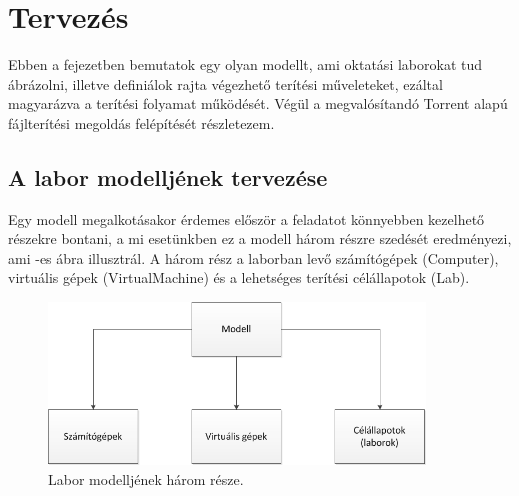 \chapter{Tervezés}
\label{chp:design}
Ebben a fejezetben bemutatok egy olyan modellt, ami oktatási laborokat tud ábrázolni, illetve definiálok rajta végezhető terítési műveleteket, ezáltal magyarázva a terítési folyamat működését. Végül a megvalósítandó Torrent alapú fájlterítési megoldás felépítését részletezem.

\section{A labor modelljének tervezése}
\label{design_model}

Egy modell megalkotásakor érdemes először a feladatot könnyebben kezelhető részekre bontani, a mi esetünkben ez a modell három részre szedését eredményezi, ami -es ábra illusztrál. A három rész a laborban levő számítógépek (Computer), virtuális gépek (VirtualMachine) és a lehetséges terítési célállapotok (Lab).

\begin{figure}[ht]
	\centering
	\includegraphics[width=100mm, keepaspectratio]{figures/design_modelparts.png}
	\caption{Labor modelljének három része.}
	\label{fig:designmodelparts}
\end{figure}

